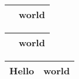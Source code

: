 \documentclass[11pt,a4paper]{article}
\begin{document}
\begin{tabular}{|p{}|p{}|}%
	\hline
	\leavevmode\color{blue}{Hello} & world \\
	\hline
\end{tabular}

\begin{tabular}{|c|c|}%
	\hline
	\color{blue}{Hello} & world \\
	\hline
\end{tabular}

\begin{tabular}{|p{}|p{}|}%
	\hline
	Hello & world \\
	\hline
\end{tabular}
\end{document}
